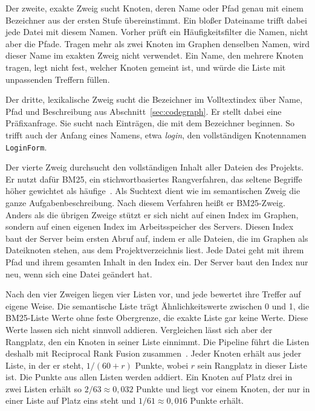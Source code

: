 Der zweite, exakte Zweig sucht Knoten, deren Name oder Pfad genau mit einem Bezeichner aus der ersten Stufe übereinstimmt. Ein bloßer Dateiname trifft dabei jede Datei mit diesem Namen. Vorher prüft ein Häufigkeitsfilter die Namen, nicht aber die Pfade. Tragen mehr als zwei Knoten im Graphen denselben Namen, wird dieser Name im exakten Zweig nicht verwendet. Ein Name, den mehrere Knoten tragen, legt nicht fest, welcher Knoten gemeint ist, und würde die Liste mit unpassenden Treffern füllen.

Der dritte, lexikalische Zweig sucht die Bezeichner im Volltextindex über Name, Pfad und Beschreibung aus Abschnitt~\ref{sec:codegraph}. Er stellt dabei eine Präfixanfrage. Sie sucht nach Einträgen, die mit dem Bezeichner beginnen. So trifft auch der Anfang eines Namens, etwa \emph{login}, den vollständigen Knotennamen \texttt{LoginForm}.

Der vierte Zweig durchsucht den vollständigen Inhalt aller Dateien des Projekts. Er nutzt dafür BM25, ein stichwortbasiertes Rangverfahren, das seltene Begriffe höher gewichtet als häufige~\parencite{robertson2009bm25}. Als Suchtext dient wie im semantischen Zweig die ganze Aufgabenbeschreibung. Nach diesem Verfahren heißt er BM25-Zweig. Anders als die übrigen Zweige stützt er sich nicht auf einen Index im Graphen, sondern auf einen eigenen Index im Arbeitsspeicher des Servers. Diesen Index baut der Server beim ersten Abruf auf, indem er alle Dateien, die im Graphen als Dateiknoten stehen, aus dem Projektverzeichnis liest. Jede Datei geht mit ihrem Pfad und ihrem gesamten Inhalt in den Index ein. Der Server baut den Index nur neu, wenn sich eine Datei geändert hat.

Nach den vier Zweigen liegen vier Listen vor, und jede bewertet ihre Treffer auf eigene Weise. Die semantische Liste trägt Ähnlichkeitswerte zwischen 0 und 1, die BM25-Liste Werte ohne feste Obergrenze, die exakte Liste gar keine Werte. Diese Werte lassen sich nicht sinnvoll addieren. Vergleichen lässt sich aber der Rangplatz, den ein Knoten in seiner Liste einnimmt. Die Pipeline führt die Listen deshalb mit Reciprocal Rank Fusion zusammen~\parencite{cormack2009rrf}. Jeder Knoten erhält aus jeder Liste, in der er steht, $1/(60 + r)$ Punkte, wobei $r$ sein Rangplatz in dieser Liste ist. Die Punkte aus allen Listen werden addiert. Ein Knoten auf Platz drei in zwei Listen erhält so $2/63 \approx 0{,}032$ Punkte und liegt vor einem Knoten, der nur in einer Liste auf Platz eins steht und $1/61 \approx 0{,}016$ Punkte erhält.

